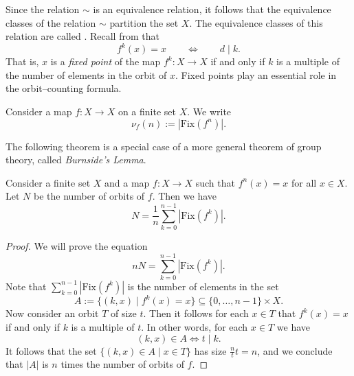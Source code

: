 Since the relation $\sim$ is an equivalence relation, it follows that the equivalence classes of the relation $\sim$ partition the set $X$. The equivalence classes of this relation are called . Recall from  that
\begin{equation*}
  f^k(x)=x\qquad\Leftrightarrow\qquad d\mid k.
\end{equation*}
That is, $x$ is a \emph{fixed point} of the map $f^k:X\to X$ if and only if $k$ is a multiple of the number of elements in the orbit of $x$. Fixed points play an essential role in the orbit--counting formula.

\begin{definition}
  Consider a map $f:X\to X$ on a finite set $X$. We write
  \begin{equation*}
    \nu_f(n):=|\mathrm{Fix}(f^n)|.
  \end{equation*}
\end{definition}

The following theorem is a special case of a more general theorem of group theory, called \emph{Burnside's Lemma}.

\begin{lemma}\label{theorem:orbit-counting}
  Consider a finite set $X$ and a map $f:X\to X$ such that $f^n(x)=x$ for all $x\in X$. Let $N$ be the number of orbits of $f$. Then we have
  \begin{equation*}
    N=\frac{1}{n}\sum_{k=0}^{n-1}|\mathrm{Fix}(f^k)|.
  \end{equation*}
\end{lemma}

\begin{proof}
  We will prove the equation
  \begin{equation*}
    nN=\sum_{k=0}^{n-1}|\mathrm{Fix}(f^k)|.
  \end{equation*}
  Note that $\sum\nolimits_{k=0}^{n-1}|\mathrm{Fix}(f^k)|$ is the number of elements in the set
  \begin{equation*}
    A:=\{(k,x) \mid f^k(x)=x\}\subseteq \{0,\ldots,n-1\}\times X.
  \end{equation*}
  Now consider an orbit $T$ of size $t$. Then it follows for each $x\in T$ that $f^k(x)=x$ if and only if $k$ is a multiple of $t$. In other words, for each $x\in T$ we have
  \begin{equation*}
    (k,x)\in A \Leftrightarrow t \mid k.
  \end{equation*}
  It follows that the set $\{(k,x)\in A\mid x\in T\}$ has size $\frac{n}{t}t=n$, and we conclude that $|A|$ is $n$ times the number of orbits of $f$.
\end{proof}

